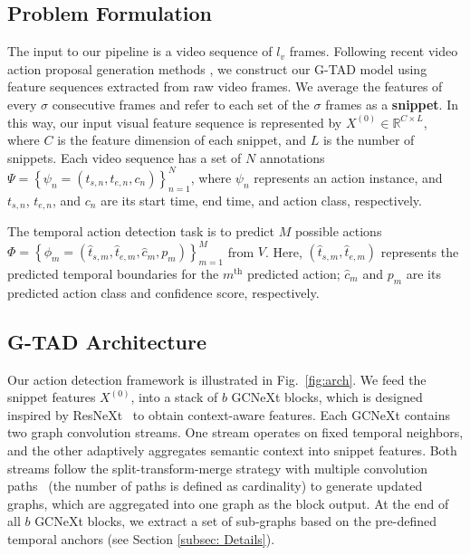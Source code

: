 \documentclass[10pt,twocolumn,letterpaper]{article}
\begin{document}
\subsection{Problem Formulation}
The input to our pipeline is a video sequence of $l_v$  frames.
Following recent video action proposal generation methods \cite{buch2017sst, escorcia2016daps, gao2017turn,lin2018bsn}, we construct our G-TAD model using feature sequences extracted from raw video frames. 
We average the features of every $\sigma$ consecutive frames and refer to each set of the $\sigma$ frames as a  \textbf{snippet}.
In this way, our input visual feature sequence is represented by
$X^{(0)}\in \mathbb{R}^{C\times L}$, 
where $C$ is the feature dimension of each snippet, and $L$ is the number of snippets. Each video sequence has a set of $N$ annotations
$\Psi  = \left \{ \psi  _n=\left (t_{s,n},t_{e,n}, c_n \right ) \right \}_{n=1}^{N}$, where $\psi_n$ represents an action instance, and $t_{s,n}$, $t_{e,n}$, and $c_n$ are its start time, end time, and action class, respectively.


The temporal action detection task is to predict ${M}$ possible actions $\Phi=  \left \{ \phi _m=\left (\hat{t}_{s,m},\hat{t}_{e,m}, \hat{c}_m, {p}_m \right ) \right \}_{m=1}^{M}$ from  $V$. Here, $(\hat{t}_{s,m},\hat{t}_{e,m})$ represents the predicted temporal boundaries for the $m^{\textrm{th}}$ predicted action; $\hat{c}_m$ and ${p}_m$ are its predicted action class and confidence score, respectively.


\subsection{G-TAD Architecture}

Our action detection framework is illustrated in Fig.~\ref{fig:arch}. 
We feed the snippet features $X^{(0)}$, into a stack of $b$ GCNeXt blocks, which is designed inspired by ResNeXt~\cite{xie2017aggregated} to obtain context-aware features. Each GCNeXt contains two graph convolution streams. One stream operates on fixed temporal neighbors, and the other adaptively aggregates semantic context into snippet features. Both streams follow the split-transform-merge strategy with multiple convolution paths~\cite{xie2017aggregated} (the number of paths is defined as cardinality) to generate updated graphs, which are aggregated into one graph as the block output.
At the end of all $b$ GCNeXt blocks, we extract a set of sub-graphs based on the pre-defined temporal anchors (see Section \ref{subsec: Details}). 
\end{document}
